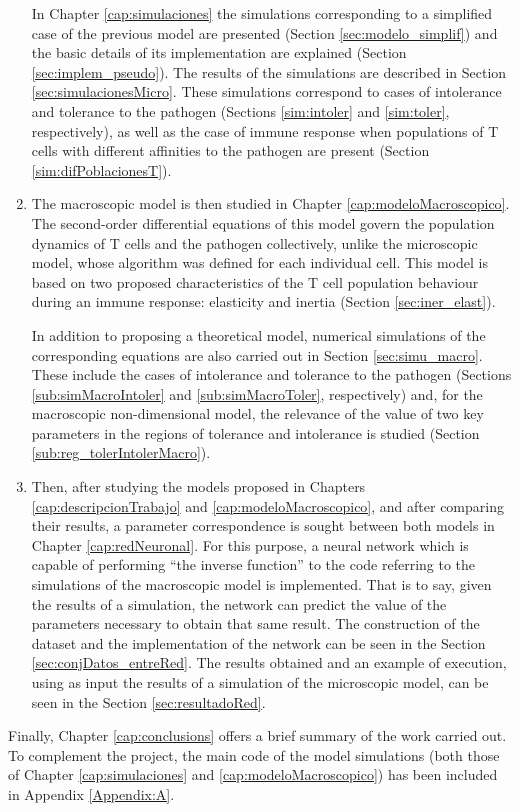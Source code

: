 \begin{enumerate}
	In Chapter \ref{cap:simulaciones} the simulations corresponding to a simplified case of the previous model are presented (Section \ref{sec:modelo_simplif}) and the basic details of its implementation are explained (Section \ref{sec:implem_pseudo}). The results of the simulations are described in Section \ref{sec:simulacionesMicro}. These simulations correspond to cases of intolerance and tolerance to the pathogen (Sections \ref{sim:intoler} and \ref{sim:toler}, respectively), as well as the case of immune response when populations of T cells with different affinities to the pathogen are present (Section \ref{sim:difPoblacionesT}).
	
	\item The macroscopic model is then studied in Chapter \ref{cap:modeloMacroscopico}. The second-order differential equations of this model govern the population dynamics of T cells and the pathogen collectively, unlike the microscopic model, whose algorithm was defined for each individual cell. This model is based on two proposed characteristics of the T cell population behaviour during an immune response: elasticity and inertia (Section \ref{sec:iner_elast}). 
	
	In addition to proposing a theoretical model, numerical simulations of the corresponding equations are also carried out in Section \ref{sec:simu_macro}. These include the cases of intolerance and tolerance to the pathogen (Sections \ref{sub:simMacroIntoler} and \ref{sub:simMacroToler}, respectively) and, for the macroscopic non-dimensional model, the relevance of the value of two key parameters in the regions of tolerance and intolerance is studied (Section \ref{sub:reg_tolerIntolerMacro}).

	\item Then, after studying the models proposed in Chapters \ref{cap:descripcionTrabajo} and \ref{cap:modeloMacroscopico}, and after comparing their results, a parameter correspondence is sought between both models in Chapter \ref{cap:redNeuronal}. For this purpose, a neural network which is capable of performing ``the inverse function'' to the code referring to the simulations of the macroscopic model is implemented. That is to say, given the results of a simulation, the network can predict the value of the parameters necessary to obtain that same result. The construction of the dataset and the implementation of the network can be seen in the Section \ref{sec:conjDatos_entreRed}. The results obtained and an example of execution, using as input the results of a simulation of the microscopic model, can be seen in the Section \ref{sec:resultadoRed}.
	

\end{enumerate}

Finally, Chapter \ref{cap:conclusions} offers a brief summary of the work carried out. To complement the project, the main code of the model simulations (both those of Chapter \ref{cap:simulaciones} and \ref{cap:modeloMacroscopico}) has been included in Appendix \ref{Appendix:A}.

